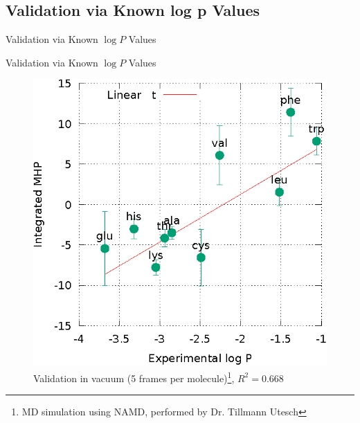 \documentclass{beamer}
\begin{document}
\subsection{Validation via Known log p Values}
\begin{frame}{Validation via Known $\log P$ Values}
	\begin{itemize}
        \setlength\itemsep{1.5em}
	\end{itemize}
\end{frame}
\begin{frame}{Validation via Known $\log P$ Values}
	\centering
	\begin{figure}[h!]
		\caption{Validation in vacuum (5 frames per molecule)\footnote{MD simulation using NAMD, performed by Dr. Tillmann Utesch}, $R^{2}=0.668$}
		\includegraphics[scale=0.75]{graph_zwitterions_vacuum.eps}
	\end{figure}
\end{frame}
\end{document}
